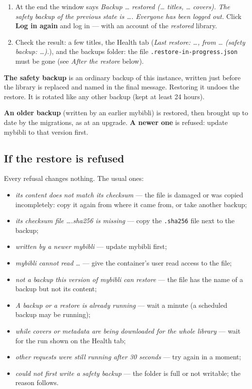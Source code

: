 \begin{enumerate}
        page (``mybibli is restoring a backup\dots''); covers are not
        served either.
  \item At the end the window says \emph{Backup \dots{} restored (\dots{}
        titles, \dots{} covers). The safety backup of the previous state
        is \dots. Everyone has been logged out.} Click \textbf{Log in
        again} and log in --- with an account of the \emph{restored}
        library.
  \item Check the result: a few titles, the Health tab (\emph{Last
        restore: \dots, from \dots{} (safety backup: \dots).}), and the
        backups folder: the file \texttt{.restore-\allowbreak in-\allowbreak progress.json}
        must be gone (see \emph{After the restore} below).
\end{enumerate}

\textbf{The safety backup} is an ordinary backup of this instance,
written just before the library is replaced and named in the final
message. Restoring it undoes the restore. It is rotated like any other
backup (kept at least 24 hours).

\textbf{An older backup} (written by an earlier mybibli) is restored,
then brought up to date by the migrations, as at an upgrade. \textbf{A
newer one} is refused: update mybibli to that version first.

\subsection*{If the restore is refused}

Every refusal changes nothing. The usual ones:
\begin{itemize}
  \item \emph{its content does not match its checksum} --- the file is
        damaged or was copied incompletely: copy it again from where it
        came from, or take another backup;
  \item \emph{its checksum file \dots.sha256 is missing} --- copy the
        \texttt{.sha256} file next to the backup;
  \item \emph{written by a newer mybibli} --- update mybibli first;
  \item \emph{mybibli cannot read \dots} --- give the container's user
        read access to the file;
  \item \emph{not a backup this version of mybibli can restore} --- the
        file has the name of a backup but not its content;
  \item \emph{A backup or a restore is already running} --- wait a
        minute (a scheduled backup may be running);
  \item \emph{while covers or metadata are being downloaded for the
        whole library} --- wait for the run shown on the Health tab;
  \item \emph{other requests were still running after 30 seconds} ---
        try again in a moment;
  \item \emph{could not first write a safety backup} --- the folder is
        full or not writable; the reason follows.
\end{itemize}

